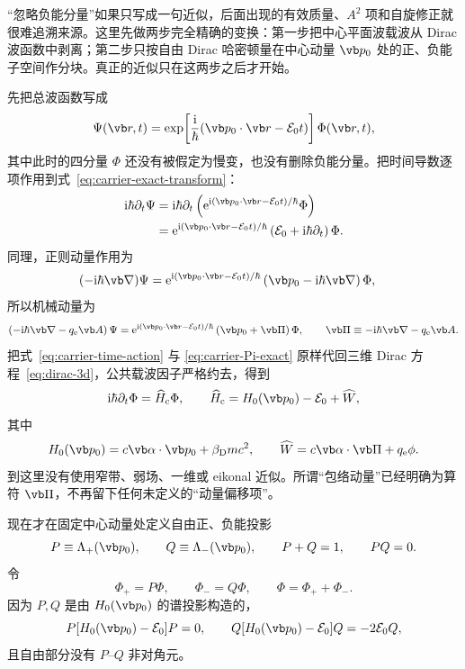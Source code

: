 “忽略负能分量”如果只写成一句近似，后面出现的有效质量、$A^2$ 项和自旋修正就很难追溯来源。这里先做两步完全精确的变换：第一步把中心平面波载波从 Dirac 波函数中剥离；第二步只按自由 Dirac 哈密顿量在中心动量 $\vb p_0$ 处的正、负能子空间作分块。真正的近似只在这两步之后才开始。

先把总波函数写成
\begin{equation}
\Psi(\vb r,t)
=\exp\!\left[\frac{\ii}{\hbar}
(\vb p_0\cdot\vb r-\mathcal E_0 t)\right]\Phi(\vb r,t),
\label{eq:carrier-exact-transform}
\end{equation}
其中此时的四分量 $\Phi$ 还没有被假定为慢变，也没有删除负能分量。把时间导数逐项作用到式~\cref{eq:carrier-exact-transform}：
\begin{align}
\ii\hbar\partial_t\Psi
&=\ii\hbar\partial_t\left(
\ee^{\ii(\vb p_0\cdot\vb r-\mathcal E_0t)/\hbar}\Phi
\right)\\
&=\ee^{\ii(\vb p_0\cdot\vb r-\mathcal E_0t)/\hbar}
\left(\mathcal E_0+\ii\hbar\partial_t\right)\Phi .
\label{eq:carrier-time-action}
\end{align}
同理，正则动量作用为
\begin{align}
(-\ii\hbar\vb\nabla)\Psi
&=\ee^{\ii(\vb p_0\cdot\vb r-\mathcal E_0t)/\hbar}
\left(\vb p_0-\ii\hbar\vb\nabla\right)\Phi,
\label{eq:carrier-momentum-action-exact}
\end{align}
所以机械动量为
\begin{equation}
\left(-\ii\hbar\vb\nabla-q_{\rm e}\vb A\right)\Psi
=\ee^{\ii(\vb p_0\cdot\vb r-\mathcal E_0t)/\hbar}
\left(\vb p_0+\vb\Pi\right)\Phi,
\qquad
\vb\Pi\equiv-\ii\hbar\vb\nabla-q_{\rm e}\vb A.
\label{eq:carrier-Pi-exact}
\end{equation}
把式~\cref{eq:carrier-time-action} 与 \cref{eq:carrier-Pi-exact} 原样代回三维 Dirac 方程~\cref{eq:dirac-3d}，公共载波因子严格约去，得到
\begin{equation}
{
\ii\hbar\partial_t\Phi
=\widehat H_{\rm c}\Phi,
\qquad
\widehat H_{\rm c}
=H_0(\vb p_0)-\mathcal E_0
+\widehat W,}
\label{eq:carrier-frame-dirac}
\end{equation}
其中
\begin{equation}
H_0(\vb p_0)=c\vb\alpha\cdot\vb p_0+\beta_{\rm D}mc^2,
\qquad
{
\widehat W=c\vb\alpha\cdot\vb\Pi+q_{\rm e}\phi.}
\label{eq:carrier-frame-W}
\end{equation}
到这里没有使用窄带、弱场、一维或 eikonal 近似。所谓“包络动量”已经明确为算符 $\vb\Pi$，不再留下任何未定义的“动量偏移项”。

现在才在固定中心动量处定义自由正、负能投影
\begin{equation}
P\equiv\Lambda_+(\vb p_0),
\qquad
Q\equiv\Lambda_-(\vb p_0),
\qquad
P+Q=1,
\qquad
PQ=0.
\label{eq:Feshbach-PQ}
\end{equation}
令
\begin{equation}
\Phi_+=P\Phi,
\qquad
\Phi_-=Q\Phi,
\qquad
\Phi=\Phi_++\Phi_-.
\end{equation}
因为 $P,Q$ 是由 $H_0(\vb p_0)$ 的谱投影构造的，
\begin{equation}
P[H_0(\vb p_0)-\mathcal E_0]P=0,
\qquad
Q[H_0(\vb p_0)-\mathcal E_0]Q=-2\mathcal E_0Q,
\end{equation}
且自由部分没有 $P$--$Q$ 非对角元。

